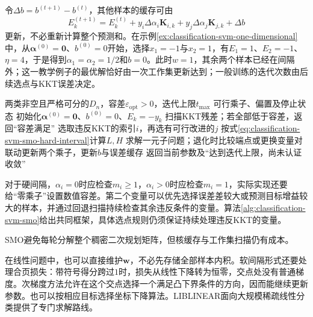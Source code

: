 令$\Delta b=b^{(t+1)}-b^{(t)}$，其他样本的缓存可由
\[
  E_k^{(t+1)}
  =E_k^{(t)}
   +y_i\Delta\alpha_i\bm{K}_{i,k}
   +y_j\Delta\alpha_j\bm{K}_{j,k}
   +\Delta b
\]
更新，不必重新计算整个预测和。在示例\ref{ex:classification-svm-one-dimensional}中，从$\bm{\alpha}^{(0)}=\bm{0}$、$b^{(0)}=0$开始，选择$x_1=-1$与$x_2=1$，有$E_1=1$、$E_2=-1$、$\eta=4$，于是得到$\alpha_1=\alpha_2=1/2$和$b=0$。此时$w=1$，其余两个样本已经在间隔外；这一教学例子的最优解恰好由一次工作集更新达到；一般训练的迭代次数由后续选点与KKT误差决定。

\begin{algorithm}[硬间隔SMO的训练框架]
  \label{alg:classification-svm-smo}
  \begin{algorithmic}[1]
    \Require 两类非空且严格可分的$D_n$，容差$\varepsilon_{\mathrm{opt}}>0$，迭代上限$t_{\max}$
    \Ensure 可行乘子、偏置及停止状态
    \State 初始化$\bm{\alpha}^{(0)}=\bm{0}$、$b^{(0)}=0$、$E_k=-y_k$
      \State 扫描KKT残差；若全部低于容差，返回“容差满足”
      \State 选取违反KKT的索引$i$，再选有可行改进的$j$
      \State 按式\eqref{eq:classification-svm-smo-hard-interval}计算$L,H$
      \State 求解一元子问题；退化时比较端点或更换变量对
      \State 联动更新两个乘子，更新$b$与误差缓存
    \EndFor
    \State 返回当前参数及“达到迭代上限，尚未认证收敛”
  \end{algorithmic}
\end{algorithm}

对于硬间隔，$\alpha_i=0$时应检查$m_i\ge1$，$\alpha_i>0$时应检查$m_i=1$，实际实现还要给“零乘子”设置数值容差。第二个变量可以优先选择误差差较大或预测目标增益较大的样本，并通过回退扫描持续检查其余违反条件的变量。算法\ref{alg:classification-svm-smo}给出共同框架，具体选点规则仍须保证持续处理违反KKT的变量。

SMO避免每轮分解整个稠密二次规划矩阵，但核缓存与工作集扫描仍有成本。

在线性问题中，也可以直接维护$\bm{w}$，不必先存储全部样本内积。软间隔形式还要处理合页损失：带符号得分跨过$1$时，损失从线性下降转为恒零，交点处没有普通梯度。次梯度方法允许在这个交点选择一个满足凸下界条件的方向，因而能继续更新参数。也可以按相应目标选择坐标下降算法。LIBLINEAR面向大规模稀疏线性分类提供了专门求解路线。

